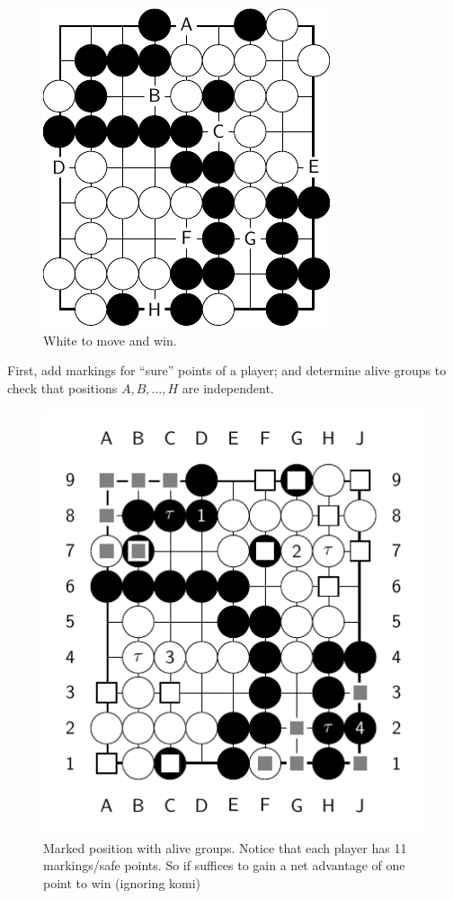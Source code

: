 \documentclass[../math194_paper.tex]{subfiles}
\begin{document}
\begin{figure}[H]
    \centering
    \includegraphics{figures/endgame_position.pdf}
    \caption*{White to move and win.}
\end{figure}
First, add markings for ``sure'' points of a player; and determine alive groups to check that positions $A,B,\ldots, H$
are independent.
\begin{figure}[H]
    \centering
    \includegraphics{figures/endgame_position_annotated.pdf}
    \caption*{Marked position with alive groups. Notice that each player has 11 markings/safe points. So 
    if suffices to gain a net advantage of one point to win (ignoring komi)}
\end{figure}
\end{document}
